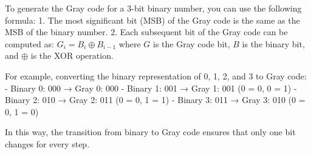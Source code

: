 To generate the Gray code for a 3-bit binary number, you can use the following formula:
1. The most significant bit (MSB) of the Gray code is the same as the MSB of the binary number.
2. Each subsequent bit of the Gray code can be computed as: \( G_i = B_i \oplus B_{i-1} \) where \( G \) is the Gray code bit, \( B \) is the binary bit, and \( \oplus \) is the XOR operation.

For example, converting the binary representation of 0, 1, 2, and 3 to Gray code:
- Binary 0: 000 → Gray 0: 000
- Binary 1: 001 → Gray 1: 001 (0  = 0, 0  = 1)
- Binary 2: 010 → Gray 2: 011 (0  = 0, 1  = 1)
- Binary 3: 011 → Gray 3: 010 (0  = 0, 1  = 0)

In this way, the transition from binary to Gray code ensures that only one bit changes for every step.

